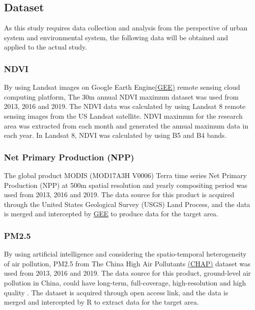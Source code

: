 \subsection{Dataset}
As this study requires data collection and analysis from the perspective of urban system and environmental system, the following data will be obtained and applied to the actual study.\\

\subsubsection{NDVI}
By using Landsat images on Google Earth Engine\href{https://github.com/Jackeytanlor/CASA_Dissertation/blob/main/code/GEE_NDVI}{(GEE)} remote sensing cloud computing platform, The 30m annual NDVI maximum dataset was used from 2013, 2016 and 2019. The NDVI data was calculated by using Landsat 8 remote sensing images from the US Landsat satellite. NDVI maximum for the research area was extracted from each month and generated the annual maximum data in each year. In Landsat 8, NDVI was calculated by using B5 and B4 bands.\\

\subsubsection{Net Primary Production (NPP)}
The global product MODIS (MOD17A3H V0006) Terra time series Net Primary Production (NPP)  at 500m spatial resolution and yearly compositing period was used from 2013, 2016 and 2019. The data source for this product is acquired through the United States Geological Survey (USGS) Land Process, and the data is merged and intercepted by \href{https://github.com/Jackeytanlor/CASA_Dissertation/blob/main/code/GEE_NDVI}{GEE} to produce data for the target area.\\

\subsubsection{PM2.5}
By using artificial intelligence and considering the spatio-temporal heterogeneity of air pollution, PM2.5 from The China High Air Pollutants \href{https://weijing-rs.github.io/product.html}{(CHAP)} dataset was used from 2013, 2016 and 2019. The data source for this product, ground-level air pollution in China, could have long-term, full-coverage, high-resolution and high quality \parencite{wei_chinahighpm10_2021}. The dataset is acquired through open access link, and the data is merged and intercepted by R to extract data for the target area.\\

